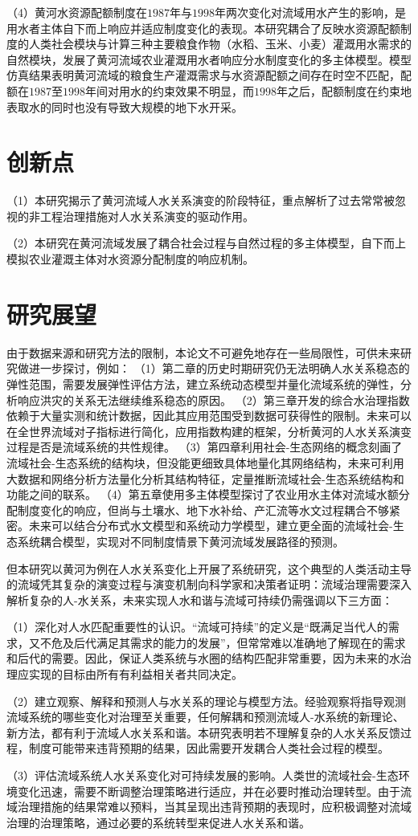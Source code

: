 （4）黄河水资源配额制度在$1987$年与$1998$年两次变化对流域用水产生的影响，是用水者主体自下而上响应并适应制度变化的表现。本研究耦合了反映水资源配额制度的人类社会模块与计算三种主要粮食作物（水稻、玉米、小麦）灌溉用水需求的自然模块，发展了黄河流域农业灌溉用水者响应分水制度变化的多主体模型。模型仿真结果表明黄河流域的粮食生产灌溉需求与水资源配额之间存在时空不匹配，配额在$1987$至$1998$年间对用水的约束效果不明显，而$1998$年之后，配额制度在约束地表取水的同时也没有导致大规模的地下水开采。

\section{创新点}

（1）本研究揭示了黄河流域人水关系演变的阶段特征，重点解析了过去常常被忽视的非工程治理措施对人水关系演变的驱动作用。

（2）本研究在黄河流域发展了耦合社会过程与自然过程的多主体模型，自下而上模拟农业灌溉主体对水资源分配制度的响应机制。

\section{研究展望}

由于数据来源和研究方法的限制，本论文不可避免地存在一些局限性，可供未来研究做进一步探讨，例如：
（1）第二章的历史时期研究仍无法明确人水关系稳态的弹性范围，需要发展弹性评估方法，建立系统动态模型并量化流域系统的弹性，分析响应洪灾的关系无法继续维系稳态的原因。
（2）第三章开发的综合水治理指数依赖于大量实测和统计数据，因此其应用范围受到数据可获得性的限制。未来可以在全世界流域对子指标进行简化，应用指数构建的框架，分析黄河的人水关系演变过程是否是流域系统的共性规律。
（3）第四章利用社会-生态网络的概念刻画了流域社会-生态系统的结构块，但没能更细致具体地量化其网络结构，未来可利用大数据和网络分析方法量化分析其结构特征，定量推断流域社会-生态系统结构和功能之间的联系。
（4）第五章使用多主体模型探讨了农业用水主体对流域水额分配制度变化的响应，但尚与土壤水、地下水补给、产汇流等水文过程耦合不够紧密。未来可以结合分布式水文模型和系统动力学模型，建立更全面的流域社会-生态系统耦合模型，实现对不同制度情景下黄河流域发展路径的预测。

但本研究以黄河为例在人水关系变化上开展了系统研究，这个典型的人类活动主导的流域凭其复杂的演变过程与演变机制向科学家和决策者证明：流域治理需要深入解析复杂的人-水关系，未来实现人水和谐与流域可持续仍需强调以下三方面：

（1）深化对人水匹配重要性的认识。“流域可持续”的定义是“既满足当代人的需求，又不危及后代满足其需求的能力的发展”，但常常难以准确地了解现在的需求和后代的需要。因此，保证人类系统与水圈的结构匹配非常重要，因为未来的水治理应实现的目标由所有有利益相关者共同决定。

（2）建立观察、解释和预测人与水关系的理论与模型方法。经验观察将指导观测流域系统的哪些变化对治理至关重要，任何解耦和预测流域人-水系统的新理论、新方法，都有利于流域人水关系和谐。本研究表明若不理解复杂的人水关系反馈过程，制度可能带来违背预期的结果，因此需要开发耦合人类社会过程的模型。

（3）评估流域系统人水关系变化对可持续发展的影响。人类世的流域社会-生态环境变化迅速，需要不断调整治理策略进行适应，并在必要时推动治理转型。由于流域治理措施的结果常难以预料，当其呈现出违背预期的表现时，应积极调整对流域治理的治理策略，通过必要的系统转型来促进人水关系和谐。
